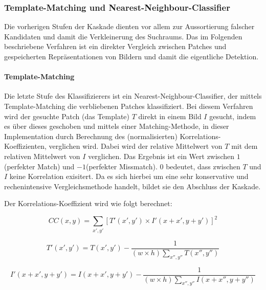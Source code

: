 
	\subsubsection{Template-Matching und Nearest-Neighbour-Classifier}

	Die vorherigen Stufen der Kaskade dienten vor allem zur Aussortierung falscher Kandidaten und damit die Verkleinerung des Suchraums. Das im Folgenden beschriebene Verfahren ist ein direkter Vergleich zwischen Patches und gespeicherten Repräsentationen von Bildern und damit die eigentliche Detektion.

	\paragraph{Template-Matching}
	Die letzte Stufe des Klassifizierers ist ein Nearest-Neighbour-Classifier, der mittels Template-Matching die verbliebenen Patches klassifiziert. Bei diesem Verfahren wird der gesuchte Patch (das Template) $T$ direkt in einem Bild $I$ gesucht, indem es über dieses geschoben und mittels einer Matching-Methode, in dieser Implementation durch Berechnung des (normalisierten) Korrelations-Koeffizienten, verglichen wird. Dabei wird der relative Mittelwert von $T$ mit dem relativen Mittelwert von $I$ verglichen. Das Ergebnis ist ein Wert zwischen $1$(perfekter Match) und $-1$(perfekter Missmatch). $0$ bedeutet, dass zwischen $T$ und $I$ keine Korrelation exisitert. Da es sich hierbei um eine sehr konservative und rechenintensive Vergleichsmethode handelt, bildet sie den Abschluss der Kaskade.

	Der Korrelations-Koeffizient wird wie folgt berechnet:

	\begin{equation}
	CC(x,y)=\underset{x',y'}{\sum}[T'(x',y')\times I'(x+x',y+y')]^{2}
	\end{equation}


	\begin{equation}
	T'(x',y')=T(x',y')-\frac{1}{(w\times h)\underset{x'',y''}{\sum}T(x'',y'')}
	\end{equation}


	\begin{equation}
	I'(x+x',y+y')=I(x+x',y+y')-\frac{1}{(w\times h)\underset{x'',y''}{\sum}I(x+x'',y+y'')}
	\end{equation}


